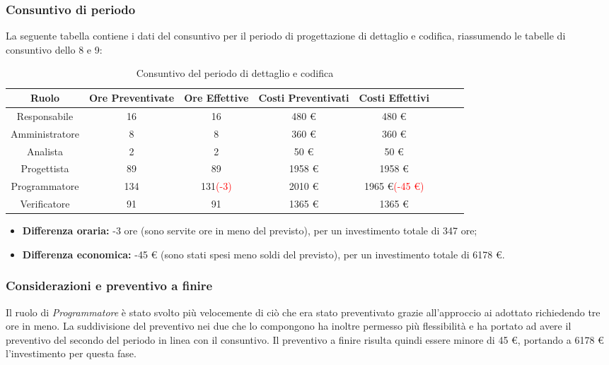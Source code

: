 \subsubsection{Consuntivo di periodo}

La seguente tabella contiene i dati del consuntivo per il periodo di progettazione di dettaglio e codifica, riassumendo le tabelle di consuntivo dello  8 e 9:
\begin{table}[H]
		\begin{center}
			\setlength{\aboverulesep}{0pt}
			\setlength{\belowrulesep}{0pt}
			\setlength{\extrarowheight}{.75ex}
			\begin{tabular}{ c c c c c c c c }
				\rowcolor{AzzurroGruppo!30} 
				\textbf{Ruolo} & \textbf{Ore Preventivate} & \textbf{Ore Effettive} & \textbf{Costi Preventivati} & \textbf{Costi Effettivi}\\
				\toprule
				Responsabile   & 16 & 16 & 480 \euro{}  & 480 \euro{}\\
				Amministratore & 8 & 8 & 360 \euro{}  & 360 \euro{} \\
				Analista       & 2 & 2 & 50 \euro{}  & 50 \euro{} \\
				Progettista    & 89 & 89 & 1958 \euro{} & 1958 \euro{} \\
				Programmatore  & 134 & 131\textcolor{red} {(-3)} & 2010 \euro{}  & 1965 \euro{}\textcolor{red}{(-45 \euro{})} \\
				Verificatore   & 91 & 91 & 1365 \euro{}  & 1365 \euro{} \\
				\bottomrule
			\end{tabular}
			\caption{Consuntivo del periodo di dettaglio e codifica}
		\end{center}
	\end{table}
	
\begin{itemize}
	\item \textbf{Differenza oraria:} -3 ore (sono servite ore in meno del previsto), per un investimento totale di 347 ore;
	\item \textbf{Differenza economica:} -45 \euro{} (sono stati spesi meno soldi del previsto), per un investimento totale di 6178 \euro{}.
\end{itemize}

\subsubsection{Considerazioni e preventivo a finire}
Il ruolo di \textit{Programmatore} è stato svolto più velocemente di ciò che era stato preventivato grazie all'approccio ai  adottato richiedendo tre ore in meno. La suddivisione del preventivo nei due  che lo compongono ha inoltre permesso più flessibilità e ha portato ad avere il preventivo del secondo  del periodo in linea con il consuntivo. \newline{}
Il preventivo a finire risulta quindi essere minore di 45 \euro{}, portando a 6178 \euro{} l'investimento per questa fase.

